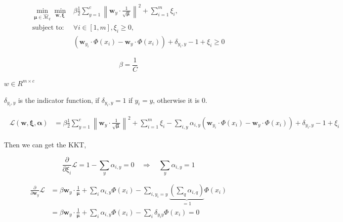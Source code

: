 \documentclass{article}
\begin{document}
\begin{equation}
    \begin{aligned}
        \min _{\boldsymbol{\mu} \in \widehat{\mathcal{M}}_{q}} \min _{\mathbf{w}, \boldsymbol{\xi}}
         & \beta  \frac{1}{2}  \sum_{y=1}^{c} \left\|\mathbf{w}_{y} \cdot \frac{1}{\sqrt{\bm{\mu}}}\right\|^{2}+\sum_{i=1}^{m} \xi_{i},                    \\
        \text{subject to: }
         & \forall i \in[1, m], \xi_{i} \geq 0,                                                                                                            \\
         & \left(\mathbf{w}_{y_{i}} \cdot \Phi\left(x_{i}\right)-\mathbf{w}_{y} \cdot \Phi\left(x_{i}\right)\right) + \delta_{y_i, y} - 1 + \xi_{i} \geq 0
    \end{aligned}
\end{equation}

\begin{equation}
    \beta = \frac{1}{C}
\end{equation}


$w \in R^{m \times c}$

$\delta_{y_i, y}$ is the indicator function, if $\delta_{y_i, y} = 1$ if $y_i = y$, otherwise it is 0.

\begin{align}
    \begin{aligned}
        \mathcal{L}(\mathbf{w}, \boldsymbol{\xi}, \bm{\alpha})
         & = \beta \frac{1}{2}  \sum_{y=1}^{c} {\left\|\mathbf{w}_{y} \cdot \frac{1}{\sqrt{\bm{\mu}}} \right\|^{2}}
        + \sum_{i=1}^{m} \xi_{i}
        - \sum_{i, y} \alpha_{i, y}\left(\mathbf{w}_{y_{i}} \cdot \Phi\left(x_{i}\right)-\mathbf{w}_{y} \cdot \Phi\left(x_{i}\right)\right) + \delta_{y_i, y} - 1 + \xi_{i}
    \end{aligned}
\end{align}

Then we can get the KKT,

\begin{equation}
    \frac{\partial}{\partial \xi_{i}} \mathcal{L}=1- \sum_{y} \alpha_{i, y}=0 \quad \Rightarrow \quad \sum_{y} \alpha_{i, y} = 1
    \label{eq:2b_xi}
\end{equation}


\begin{equation}
    \begin{aligned}
        \frac{\partial}{\partial \bm{w}_{y}} \mathcal{L} & =
        \beta \bm{w}_{y} \cdot \frac{1}{\bm{\mu}} + \sum_{i} \alpha_{i, y} \Phi({x}_{i})-\sum_{i, y_{i}=y} \underbrace{\left(\sum_{q} \alpha_{i, q}\right)}_{=1} \Phi({x}_{i})          \\
                                                         & =\beta \bm{w}_{y} \cdot \frac{1}{\bm{\mu}} + \sum_{i} \alpha_{i, y} \Phi({x}_{i})- \sum_{i} \delta_{y_{i} y} \Phi({x}_{i})=0
    \end{aligned}
\end{equation}
\end{document}
